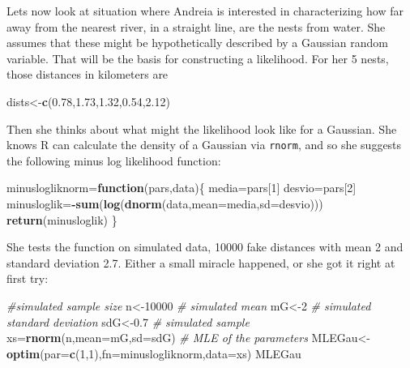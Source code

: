 \documentclass[
]{book}
\newenvironment{Shaded}{\begin{snugshade}}{\end{snugshade}}
\newcommand{\CommentTok}[1]{\textcolor[rgb]{0.56,0.35,0.01}{\textit{#1}}}
\newcommand{\ControlFlowTok}[1]{\textcolor[rgb]{0.13,0.29,0.53}{\textbf{#1}}}
\newcommand{\DataTypeTok}[1]{\textcolor[rgb]{0.13,0.29,0.53}{#1}}
\newcommand{\DecValTok}[1]{\textcolor[rgb]{0.00,0.00,0.81}{#1}}
\newcommand{\FloatTok}[1]{\textcolor[rgb]{0.00,0.00,0.81}{#1}}
\newcommand{\KeywordTok}[1]{\textcolor[rgb]{0.13,0.29,0.53}{\textbf{#1}}}
\newcommand{\NormalTok}[1]{#1}
\newcommand{\OperatorTok}[1]{\textcolor[rgb]{0.81,0.36,0.00}{\textbf{#1}}}
\begin{document}
Lets now look at situation where Andreia is interested in characterizing how far away from the nearest river, in a straight line, are the nests from water. She assumes that these might be hypothetically described by a Gaussian random variable. That will be the basis for constructing a likelihood. For her 5 nests, those distances in kilometers are

\begin{Shaded}
\begin{Highlighting}[]
\NormalTok{dists<-}\KeywordTok{c}\NormalTok{(}\FloatTok{0.78}\NormalTok{,}\FloatTok{1.73}\NormalTok{,}\FloatTok{1.32}\NormalTok{,}\FloatTok{0.54}\NormalTok{,}\FloatTok{2.12}\NormalTok{)}
\end{Highlighting}
\end{Shaded}

Then she thinks about what might the likelihood look like for a Gaussian. She knows R can calculate the density of a Gaussian via \texttt{rnorm}, and so she suggests the following minus log likelihood function:

\begin{Shaded}
\begin{Highlighting}[]
\NormalTok{minuslogliknorm=}\ControlFlowTok{function}\NormalTok{(pars,data)\{}
\NormalTok{  media=pars[}\DecValTok{1}\NormalTok{]}
\NormalTok{  desvio=pars[}\DecValTok{2}\NormalTok{]}
\NormalTok{  minusloglik=}\OperatorTok{-}\KeywordTok{sum}\NormalTok{(}\KeywordTok{log}\NormalTok{(}\KeywordTok{dnorm}\NormalTok{(data,}\DataTypeTok{mean=}\NormalTok{media,}\DataTypeTok{sd=}\NormalTok{desvio)))}
  \KeywordTok{return}\NormalTok{(minusloglik)}
\NormalTok{\}}
\end{Highlighting}
\end{Shaded}

She tests the function on simulated data, 10000 fake distances with mean 2 and standard deviation 2.7. Either a small miracle happened, or she got it right at first try:

\begin{Shaded}
\begin{Highlighting}[]
\CommentTok{#simulated sample size}
\NormalTok{n<-}\DecValTok{10000}
\CommentTok{# simulated mean}
\NormalTok{mG<-}\DecValTok{2}
\CommentTok{# simulated standard deviation}
\NormalTok{sdG<-}\FloatTok{0.7}
\CommentTok{# simulated sample}
\NormalTok{xs=}\KeywordTok{rnorm}\NormalTok{(n,}\DataTypeTok{mean=}\NormalTok{mG,}\DataTypeTok{sd=}\NormalTok{sdG)}
\CommentTok{# MLE of the parameters}
\NormalTok{MLEGau<-}\KeywordTok{optim}\NormalTok{(}\DataTypeTok{par=}\KeywordTok{c}\NormalTok{(}\DecValTok{1}\NormalTok{,}\DecValTok{1}\NormalTok{),}\DataTypeTok{fn=}\NormalTok{minuslogliknorm,}\DataTypeTok{data=}\NormalTok{xs)}
\NormalTok{MLEGau}
\end{Highlighting}
\end{Shaded}
\end{document}
